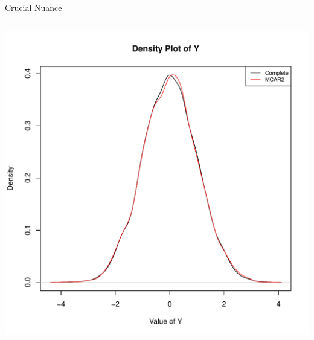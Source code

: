 \documentclass{beamer}\usepackage[]{graphicx}\usepackage[]{color}
\newenvironment{knitrout}{}{} %
\begin{document}
\begin{frame}{Crucial Nuance}
\begin{columns}
\begin{column}{0.5\textwidth}
\begin{knitrout}
{\centering \includegraphics[width=1\linewidth]{figure/unnamed-chunk-16-1} 

}



\end{knitrout}
  
\end{column}
\end{columns}

\end{frame}
\end{document}

